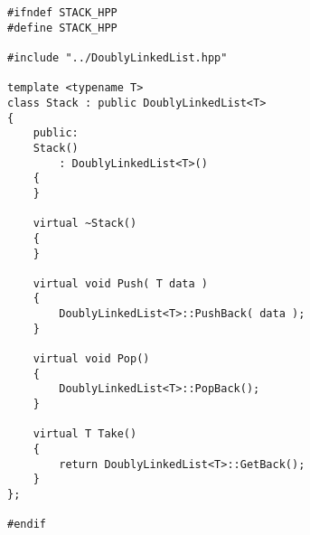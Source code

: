 \documentclass[a4paper,12pt,oneside]{book}
\begin{document}
\begin{lstlisting}[style=code]
#ifndef STACK_HPP
#define STACK_HPP

#include "../DoublyLinkedList.hpp"

template <typename T>
class Stack : public DoublyLinkedList<T>
{
    public:
    Stack()
        : DoublyLinkedList<T>()
    {
    }

    virtual ~Stack()
    {
    }

    virtual void Push( T data )
    {
        DoublyLinkedList<T>::PushBack( data );
    }

    virtual void Pop()
    {
        DoublyLinkedList<T>::PopBack();
    }

    virtual T Take()
    {
        return DoublyLinkedList<T>::GetBack();
    }
};

#endif

\end{lstlisting}
\end{document}
